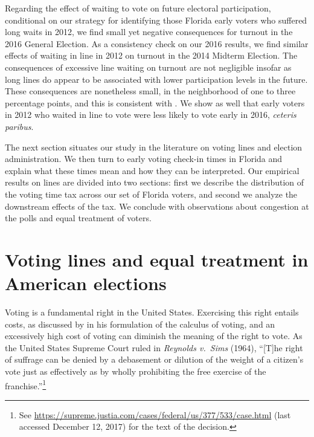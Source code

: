 \documentclass[12pt,titlepage]{article}
\begin{document}
Regarding the effect of waiting to vote on future electoral
participation, conditional on our strategy for identifying those
Florida early voters who suffered long waits in 2012, we find small
yet negative consequences for turnout in the 2016 General Election.
As a consistency check on our 2016 results, we find similar effects of
waiting in line in 2012 on turnout in the 2014 Midterm Election.  The
consequences of excessive line waiting on turnout are not negligible
insofar as long lines do appear to be associated with lower
participation levels in the future.  These consequences are
nonetheless small, in the neighborhood of one to three percentage
points, and this is consistent with
\citet{pettigrew:longlinesminorityprecincts}.  We show as well that
early voters in 2012 who waited in line to vote were less likely to
vote early in 2016, \emph{ceteris paribus}.

The next section situates our study in the literature on voting lines
and election administration.  We then turn to early voting check-in
times in Florida and explain what these times mean and how they can be
interpreted.  Our empirical results on lines are divided into two
sections: first we describe the distribution of the voting time tax
across our set of Florida voters, and second we analyze the downstream
effects of the tax.  We conclude with observations about congestion at
the polls and equal treatment of voters.

\section*{Voting lines and equal treatment in American elections}

Voting is a fundamental right in the United States.  Exercising this
right entails costs, as discussed by \cite{downs:econtheory} in his
formulation of the calculus of voting, and an excessively high cost of
voting can diminish the meaning of the right to vote.  As the United
States Supreme Court ruled in \emph{Reynolds v.\ Sims} (1964), ``[T]he
right of suffrage can be denied by a debasement or dilution of the
weight of a citizen's vote just as effectively as by wholly
prohibiting the free exercise of the franchise.''\footnote{See
  \url{https://supreme.justia.com/cases/federal/us/377/533/case.html}
  (last accessed December 12, 2017) for the text of the decision.}
\end{document}
